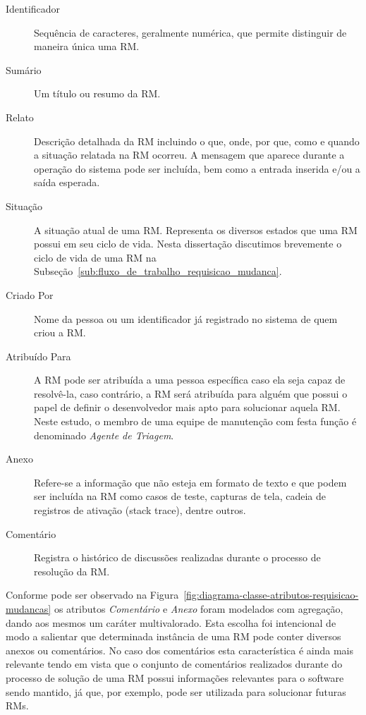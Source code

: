 \begin{description}
	\item [Identificador] Sequência de caracteres,  geralmente numérica,  que
		permite distinguir de maneira única uma RM\@.
	\item [Sumário] Um título ou resumo da RM\@.
	\item [Relato] Descrição detalhada da RM incluindo o que, onde, por que,
		como e quando a situação relatada na RM ocorreu. A mensagem que aparece
		durante a operação do sistema pode ser incluída, bem como a entrada
		inserida e/ou a saída esperada.
	\item [Situação] A situação atual de uma RM\@. Representa os diversos
		estados que uma RM possui em seu ciclo de vida. Nesta dissertação
		discutimos brevemente o ciclo de vida de uma RM na
		Subseção~\ref{sub:fluxo_de_trabalho_requisicao_mudanca}.
	\item [Criado Por] Nome da pessoa ou um identificador já registrado no
		sistema de quem criou a RM\@.
	\item [Atribuído Para] A RM pode ser atribuída a uma pessoa específica caso
		ela seja capaz de resolvê-la, caso contrário, a RM será atribuída para
		alguém que possui o papel de definir o desenvolvedor mais apto para
		solucionar aquela RM\@. Neste estudo, o membro de uma equipe de manutenção
		com festa função é denominado \textit{Agente de Triagem}.
	\item [Anexo] Refere-se a informação que não esteja em formato de texto e
		que podem ser incluída na RM como casos de teste, capturas de tela,
		cadeia de registros de ativação (stack trace), dentre outros.
	\item [Comentário] Registra o histórico de discussões realizadas durante o
		processo de resolução da RM\@.
\end{description}


Conforme pode ser observado na
Figura~\ref{fig:diagrama-classe-atributos-requisicao-mudancas} os atributos
\textit{Comentário} e \textit{Anexo} foram modelados com agregação, dando aos
mesmos um caráter multivalorado. Esta escolha foi intencional de modo a
salientar que determinada instância de uma RM pode conter diversos anexos ou
comentários. No caso dos comentários esta característica é ainda mais relevante
tendo em vista que o conjunto de comentários realizados durante do processo de
solução de uma RM possui informações relevantes para o software sendo mantido,
já que, por exemplo, pode ser utilizada para solucionar futuras RMs.

